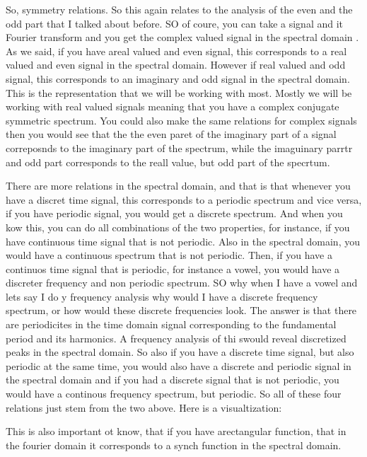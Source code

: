  
 So, symmetry relations.  So this again relates to the analysis of the even and the odd part that I talked about before.  SO of coure, you can take a signal and it Fourier transform and you get the complex valued signal in the spectral domain . As we said, if you have areal valued and even signal, this corresponds to a real valued and even signal in the spectral domain.  However if real valued and odd signal, this corresponds to an imaginary and odd signal in the spectral domain. This is the representation that we will be working with most. Mostly we will be working with real valued signals meaning that you have a complex conjugate symmetric spectrum.  You could also make the same relations for complex signals then you would see that the the even paret of the imaginary part of a signal correposnds to the imaginary part of the spectrum, while the imaguinary parrtr and odd part corresponds to the reall value, but odd part of the specrtum.
 
 There are more relations in the spectral domain, and that is that whenever you have a discret time signal, this corresponds to a periodic spectrum and vice versa, if you have periodic signal, you would get a discrete spectrum. And when you kow this, you can do all  combinations of the two properties, for instance, if you have  continuous time signal that is not periodic. Also in the spectral domain, you would have a continuous spectrum that is not periodic. Then, if you have a continuos time signal that is periodic, for instance a vowel, you would have a discreter frequency and non periodic spectrum.  SO why when I have a vowel and lets say I do y frequency analysis why would I have a discrete frequency spectrum, or how would these discrete frequencies look.  The answer is that there are periodicites in the time domain signal corresponding to the fundamental period and its harmonics.  A frequency analysis of thi swould reveal discretized peaks in the spectral domain. So also if you have a discrete time signal, but also periodic at the same time, you would also have a discrete and periodic signal in the spectral domain and if you had a discrete signal that is not periodic, you would have a continous frequency spectrum, but periodic. So all of these four relations just stem from the two above. Here is a visualtization:
 
This is also important ot know, that if you have arectangular function, that in the fourier domain it corresponds to a synch function in the spectral domain.



